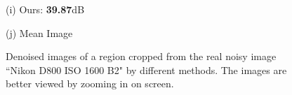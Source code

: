 \documentclass[10pt,onecolumn,letterpaper]{article}
\begin{document}
\begin{figure}[H]
{\begin{minipage}[t]{0.196\textwidth}
{\footnotesize (i) Ours: \textbf{39.87}dB  }
\end{minipage}
\begin{minipage}[t]{0.196\textwidth}
\centering
{}
{\footnotesize (j) Mean Image \cite{crosschannel2016} }
\end{minipage}
}
\caption{Denoised images of a region cropped from the real noisy image ``Nikon D800 ISO 1600 B2" \cite{crosschannel2016} by different methods. The images are better viewed by zooming in on screen.} 
\label{fig15}
\end{figure}
\end{document}
